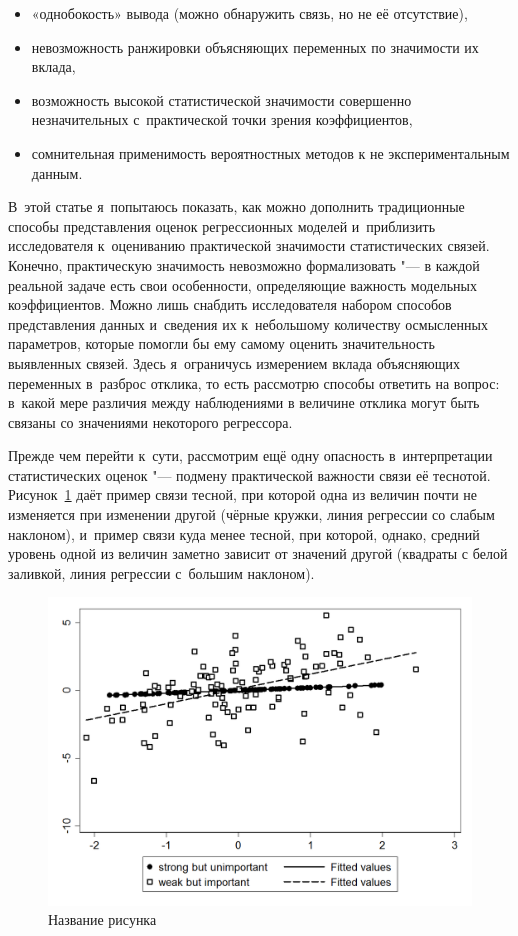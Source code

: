 \documentclass[11pt]{article}
\begin{document}
\begin{itemize}
	\item «однобокость» вывода (можно обнаружить связь, но не её отсутствие),
	\item невозможность ранжировки объясняющих переменных по значимости их вклада,
	\item возможность высокой статистической значимости совершенно незначительных с~практической точки зрения коэффициентов,
	\item сомнительная применимость вероятностных методов к не экспериментальным данным.
\end{itemize}

В~этой статье я~попытаюсь показать, как можно дополнить традиционные способы представления оценок регрессионных моделей и~приблизить исследователя к~оцениванию практической значимости статистических связей. Конечно, практическую значимость невозможно формализовать "--- в каждой реальной задаче есть свои особенности, определяющие важность модельных коэффициентов. Можно лишь снабдить исследователя набором способов представления данных и~сведения их к~небольшому количеству осмысленных параметров, которые помогли бы ему самому оценить значительность выявленных связей. Здесь я~ограничусь измерением вклада объясняющих переменных в~разброс отклика, то есть рассмотрю способы ответить на вопрос: в~какой мере различия между наблюдениями в величине отклика могут быть связаны со значениями некоторого регрессора.

Прежде чем перейти к~сути, рассмотрим ещё одну опасность в~интерпретации статистических оценок "--- подмену практической важности связи её теснотой. Рисунок~\ref{fig:regression} даёт пример связи тесной, при которой одна из величин почти не изменяется при изменении другой (чёрные кружки, линия регрессии со слабым наклоном), и~пример связи куда менее тесной, при которой, однако, средний уровень одной из величин заметно зависит от значений другой (квадраты с белой заливкой, линия регрессии с~большим наклоном).

\begin{figure}[htbp]
	\centering
	\includegraphics[width=12cm]{regression.png}
	\caption{Название рисунка}\label{fig:regression}
\end{figure}
\end{document}
